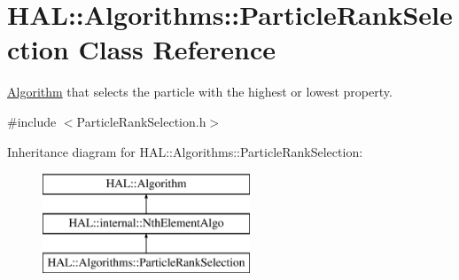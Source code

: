 \hypertarget{class_h_a_l_1_1_algorithms_1_1_particle_rank_selection}{\section{H\+A\+L\+:\+:Algorithms\+:\+:Particle\+Rank\+Selection Class Reference}
\label{class_h_a_l_1_1_algorithms_1_1_particle_rank_selection}
}


\hyperlink{class_h_a_l_1_1_algorithm}{Algorithm} that selects the particle with the highest or lowest property.  




{\ttfamily \#include $<$Particle\+Rank\+Selection.\+h$>$}

Inheritance diagram for H\+A\+L\+:\+:Algorithms\+:\+:Particle\+Rank\+Selection\+:\begin{figure}[H]
\begin{center}
\leavevmode
\includegraphics[height=3.000000cm]{class_h_a_l_1_1_algorithms_1_1_particle_rank_selection}
\end{center}
\end{figure}
